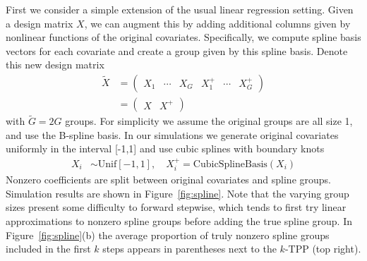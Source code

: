 \documentclass{imsart}
\begin{document}
First we consider a simple extension of the usual linear regression setting. Given a design matrix $X$, we can augment this by adding additional columns given by nonlinear functions of the original covariates. Specifically, we compute spline basis vectors for each covariate and create a group given by this spline basis. Denote this new design matrix
\begin{equation}
\label{eq:splinemat}
  \begin{aligned}
    \tilde X &=  \begin{pmatrix} X_1 & \cdots & X_G & X^+_1 & \cdots & X^+_G  \end{pmatrix}\\
    &= \begin{pmatrix} X & X^+ \end{pmatrix}
  \end{aligned}
\end{equation}
with $\tilde G = 2G$ groups. For simplicity we assume the original groups are all size 1, and use the B-spline basis. In our simulations we generate original covariates uniformly in the interval [-1,1] and use cubic splines with boundary knots
\begin{equation}
  \begin{aligned}
    X_i &\sim \text{Unif}[-1,1], \quad
    X_i^+ = \text{CubicSplineBasis}(X_i)
  \end{aligned}
\end{equation}
Nonzero coefficients are split between original covariates and spline groups. Simulation results are shown in Figure~\ref{fig:spline}. Note that the varying group sizes present some difficulty to forward stepwise, which tends to first try linear approximations to nonzero spline groups before adding the true spline group. In Figure~\ref{fig:spline}(b) the average proportion of truly nonzero spline groups included in the first $k$ steps appears in parentheses next to the $k$-TPP (top right).
\end{document}
